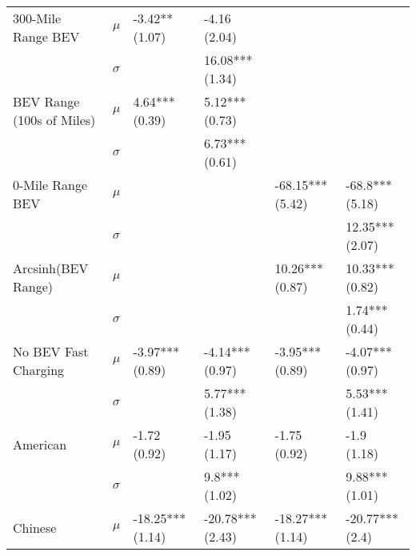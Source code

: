 \begin{tabular}{llllll}
       300-Mile Range BEV &     $\mu$ &                -3.42** (1.07) &                  -4.16 (2.04) &                                &                                \\
                          &  $\sigma$ &                               &               16.08*** (1.34) &                                &                                \\
BEV Range (100s of Miles) &     $\mu$ &                4.64*** (0.39) &                5.12*** (0.73) &                                &                                \\
                          &  $\sigma$ &                               &                6.73*** (0.61) &                                &                                \\
         0-Mile Range BEV &     $\mu$ &                               &                               &               -68.15*** (5.42) &                -68.8*** (5.18) \\
                          &  $\sigma$ &                               &                               &                                &                12.35*** (2.07) \\
       Arcsinh(BEV Range) &     $\mu$ &                               &                               &                10.26*** (0.87) &                10.33*** (0.82) \\
                          &  $\sigma$ &                               &                               &                                &                 1.74*** (0.44) \\
     No BEV Fast Charging &     $\mu$ &               -3.97*** (0.89) &               -4.14*** (0.97) &                -3.95*** (0.89) &                -4.07*** (0.97) \\
                          &  $\sigma$ &                               &                5.77*** (1.38) &                                &                 5.53*** (1.41) \\
                 American &     $\mu$ &                  -1.72 (0.92) &                  -1.95 (1.17) &                   -1.75 (0.92) &                    -1.9 (1.18) \\
                          &  $\sigma$ &                               &                 9.8*** (1.02) &                                &                 9.88*** (1.01) \\
                  Chinese &     $\mu$ &              -18.25*** (1.14) &              -20.78*** (2.43) &               -18.27*** (1.14) &                -20.77*** (2.4) \\

\end{tabular}
